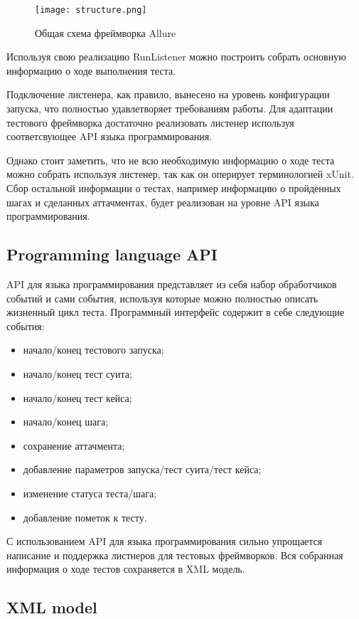 \begin{figure}
\centering
\texttt{[image: structure.png]}
\caption{Общая схема фреймворка Allure}
\label{fig:allure}
\end{figure}

Используя свою реализацию RunListener можно построить собрать основную информацию о ходе выполнения теста. 

Подключение листенера, как правило, вынесено на уровень конфигурации запуска, что полностью удавлетворяет требованиям работы. Для адаптации тестового фреймворка достаточно реализовать листенер используя соответсвующее API языка программирования.

Однако стоит заметить, что не всю необходимую информацию о ходе теста можно собрать используя листенер, так как он оперирует терминологией xUnit. Сбор остальной информации о тестах, например информацию о пройденных шагах и сделанных аттачментах, будет реализован на уровне API языка программирования.

\subsection{Programming language API}

API для языка программирования представляет из себя набор обработчиков событий и сами события, используя которые можно полностью описать жизненный цикл теста. Программный интерфейс содержит в себе следующие события:

\begin{itemize}
\item начало/конец тестового запуска;
\item начало/конец тест суита;
\item начало/конец тест кейса;
\item начало/конец шага;
\item сохранение аттачмента;
\item добавление параметров запуска/тест суита/тест кейса;
\item изменение статуса теста/шага;
\item добавление пометок к тесту.
\end{itemize}

С использованием API для языка программирования сильно упрощается написание и поддержка листнеров для тестовых фреймворков. Вся собранная информация о ходе тестов сохраняется в XML модель. 

\subsection{XML model}

